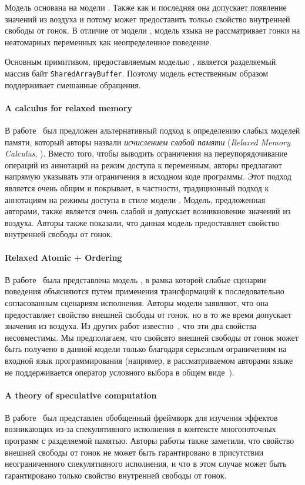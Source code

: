 Модель \JSMM основана на модели \CMM. 
Также как и последняя она допускает появление значений из воздуха
и потому может предоставить толкьо свойство внутренней свободы от гонок. 
В отличие от модели \CMM, модель языка \JS не рассматривает
гонки на неатомарных переменных как неопределенное поведение. 

Основным примитивом, предоставляемым моделью \JSMM, 
является разделяемый массив байт \texttt{SharedArrayBuffer}. 
Поэтому модель естественным образом поддерживает смешанные обращения. 

\paragraph{A calculus for relaxed memory}

В работе~\cite{Crary-Sullivan:POPL15} был предложен
альтернативный подход к определению слабых моделей памяти, 
который авторы назвали \emph{исчислением слабой памяти}
(\emph{Relaxed Memory Calculus}, \RMC).
Вместо того, чтобы выводить ограничения на переупорядочивание 
операций из аннотаций на режим доступа к переменным, 
авторы предлагают напрямую указывать эти ограничения
в исходном коде программы. 
Этот подход является очень общим и покрывает, в частности, 
традиционный подход к аннотациям на режимы доступа в стиле модели \CMM. 
Модель, предложенная авторами, также является очень слабой 
и допускает возникновение значений из воздуха. 
Авторы также показали, что данная модель предоставляет 
свойство внутренней свободы от гонок. 

\paragraph{Relaxed Atomic + Ordering}

В работе~\cite{Saraswat-al:PPoPP07} была представлена 
модель \RAO, в рамка которой слабые сценарии поведения объясняются 
путем применения трансформаций к последовательно согласованным 
сценариям исполнения. 
Авторы модели заявляют, что она предоставляет 
свойство внешней свободы от гонок,
но в то же время допускает значения из воздуха. 
Из других работ известно~\cite{Batty-al:ESOP15}, что эти два свойства несовместимы. 
Мы предполагаем, что свойсвто внешней свободы от гонок
может быть получено в данной модели только 
благодаря серьезным ограничениям на входной язык программирования 
(например, в рассматриваемом авторами языке не поддерживается оператор 
условного выбора в общем виде~\cite{PichonPharabod-Sewell:POPL16}).

\paragraph{A theory of speculative computation}

В работе~\cite{Boudol-Petri:ESOP10} был представлен 
обобщенный фреймворк для изучения эффектов возникающих 
из-за спекулятивного исполнения в контексте многопоточных программ
с разделяемой памятью. 
Авторы работы также заметили, что свойство 
внешней свободы от гонок не может быть гарантировано
в присутствии неограниченного спекулятивного исполнения, 
и что в этом случае может быть гарантировано
только свойство внутренней свободы от гонок. 
